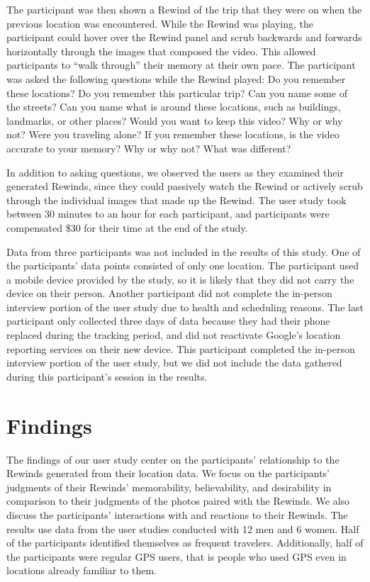 \documentclass{sigchi}
\begin{document}
The participant was then shown a Rewind of the trip that they were on when the previous location was encountered. While the Rewind was playing, the participant could hover over the Rewind panel and scrub backwards and forwards horizontally through the images that composed the video. This allowed participants to ``walk through'' their memory at their own pace. The participant was asked the following questions while the Rewind played: Do you remember these locations? Do you remember this particular trip? Can  you name some of the streets? Can you name what is around these locations, such as buildings, landmarks, or other places? Would you want to keep this video? Why or why not? Were you traveling alone? If you remember these locations, is the video accurate to your memory? Why or why not? What was different?

In addition to asking questions, we observed the users as they examined their generated Rewinds, since they could passively watch the Rewind or actively scrub through the individual images that made up the Rewind. The user study took between 30 minutes to an hour for each participant, and participants were compensated \$30 for their time at the end of the study.

Data from three participants was not included in the results of this study. One of the participants' data points consisted of only one location. The participant used a mobile device provided by the study, so it is likely that they did not carry the device on their person. Another participant did not complete the in-person interview portion of the user study due to health and scheduling reasons. The last participant only collected three days of data because they had their phone replaced during the tracking period, and did not reactivate Google's location reporting services on their new device. This participant completed the in-person interview portion of the user study, but we did not include the data gathered during this participant's session in the results.

\section{Findings}
The findings of our user study center on the participants' relationship to the Rewinds generated from their location data. We focus on the participants' judgments of their Rewinds' memorability, believability, and desirability in comparison to their judgments of the photos paired with the Rewinds. We also discuss the participants' interactions with and reactions to their Rewinds. The results use data from the user studies conducted with 12 men and 6 women. Half of the participants identified themselves as frequent travelers. Additionally, half of the participants were regular GPS users, that is people who used GPS even in locations already familiar to them.
\end{document}
